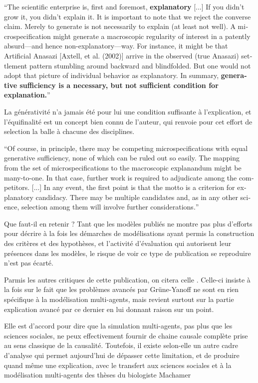 \foreignquote{english}{The scientific enterprise is, first and foremost, \textbf{explanatory} [...] If you didn’t grow it, you didn’t explain it. It is important to note that we reject the converse claim. Merely to generate is not necessarily to explain (at least not well). A microspecification might generate a macroscopic regularity of interest in a patently absurd—and hence non-explanatory—way. For instance, it might be that Artificial Anasazi [Axtell, et al. (2002)] arrive in the observed (true Anasazi) settlement pattern stumbling around backward and blindfolded. But one would not adopt that picture of individual behavior as explanatory. In summary, \textbf{generative sufficiency is a necessary, but not sufficient condition for explanation.}} \autocite{Epstein2006}

La générativité n'a jamais été pour lui une condition suffisante à l'explication, et l'équifinalité est un concept bien connu de l'auteur, qui renvoie pour cet effort de selection la balle à chacune des disciplines. 

\foreignquote{english}{Of course, in principle, there may be competing microspecifications with equal generative sufficiency, none of which can be ruled out so easily. The mapping from the set of microspecifications to the macroscopic explanandum might be many-to-one. In that case, further work is required to adjudicate among the competitors. [...] In any event, the first point is that the motto is a criterion for explanatory candidacy. There may be multiple candidates and, as in any other science, selection among them will involve further considerations.} \autocite{Epstein2006}

Que faut-il en retenir ? Tant que les modèles publiés ne montre pas plus d'efforts pour décrire à la fois les démarches de modélisations ayant permis la construction des critères et des hypothèses, et l'activité d'évaluation qui autorisent leur présences dans les modèles, le risque de voir ce type de publication se reproduire n'est pas écarté. 

Parmis les autres critiques de cette publication, on citera celle \textcite{Elsenbroich2012}. Celle-ci insiste à la fois sur le fait que les problèmes avancés par Grüne-Yanoff ne sont en rien spécifique à la modélisation multi-agents, mais revient surtout sur la partie explication avancé par ce dernier en lui donnant raison sur un point.

Elle est d'accord pour dire que la simulation multi-agents, pas plus que les sciences sociales, ne peux effectivement fournir de chaine causale complète prise au sens classique de la causalité. Toutefois, il existe selon-elle un autre cadre d'analyse qui permet aujourd'hui de dépasser cette limitation, et de produire quand même une explication, avec le transfert aux sciences sociales et à la modélisation multi-agents des thèses du biologiste Machamer \autocite{Machamer2000}

